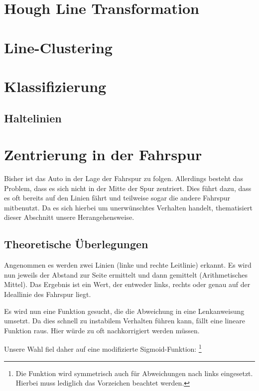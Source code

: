 \documentclass[a4paper,12pt]{report}
\begin{document}
\section{Hough Line Transformation}

\section{Line-Clustering}

\section{Klassifizierung}

\subsection{Haltelinien}

\section{Zentrierung in der Fahrspur}
	
	Bisher ist das Auto in der Lage der Fahrspur zu folgen.
	Allerdings besteht das Problem, dass es sich nicht in der Mitte der Spur zentriert.
	Dies führt dazu, dass es oft bereits auf den Linien fährt und teilweise sogar die andere Fahrspur mitbenutzt.
	Da es sich hierbei um unerwünschtes Verhalten handelt, thematisiert dieser Abschnitt unsere Herangehensweise.

\subsection{Theoretische Überlegungen}

	Angenommen es werden zwei Linien (linke und rechte Leitlinie) erkannt.
	Es wird nun jeweils der Abstand zur Seite ermittelt und dann gemittelt (Arithmetisches Mittel).
	Das Ergebnis ist ein Wert, der entweder links, rechts oder genau auf der Ideallinie des Fahrspur liegt.
	
	Es wird nun eine Funktion gesucht, die die Abweichung in eine Lenkanweisung umsetzt.
	Da dies schnell zu instabilem Verhalten führen kann, fällt eine lineare Funktion raus.
	Hier würde zu oft nachkorrigiert werden müssen.
	
	Unsere Wahl fiel daher auf eine modifizierte Sigmoid-Funktion:
	\footnote{Die Funktion wird symmetrisch auch für Abweichungen nach links eingesetzt. Hierbei muss lediglich das Vorzeichen beachtet werden.}
	
\end{document}
